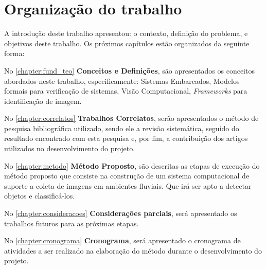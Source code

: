 \section{Organização do trabalho}
A introdução deste trabalho apresentou: o contexto, definição do problema, e objetivos deste trabalho. Os próximos capítulos estão organizados da seguinte forma:

\par
No \autoref{chapter:fund_teo} \textbf{Conceitos e Definições}, são apresentados os conceitos abordados neste trabalho, especificamente: Sistemas Embarcados, Modelos formais para verificação de sistemas, Visão Computacional, \textit{Frameworks} para identificação de imagem.

No \autoref{chapter:correlatos} \textbf{Trabalhos Correlatos}, serão apresentados o método de pesquisa bibliográfica utilizado, sendo ele a revisão sistemática, seguido do resultado encontrado com esta pesquisa e, por fim, a contribuição dos artigos utilizados no desenvolvimento do projeto.


No \autoref{chapter:metodo} \textbf{Método Proposto}, são descritas as etapas de execução do método proposto que consiste na construção de um sistema computacional de suporte a coleta de imagens em ambientes fluviais. Que irá ser apto a detectar objetos e classificá-los.

No \autoref{chapter:consideracoes} \textbf{Considerações parciais}, será apresentado os trabalhos futuros para as próximas etapas.

No \autoref{chapter:cronograma} \textbf{Cronograma}, será apresentado o cronograma de atividades a ser realizado na elaboração do método durante o desenvolvimento do projeto.
